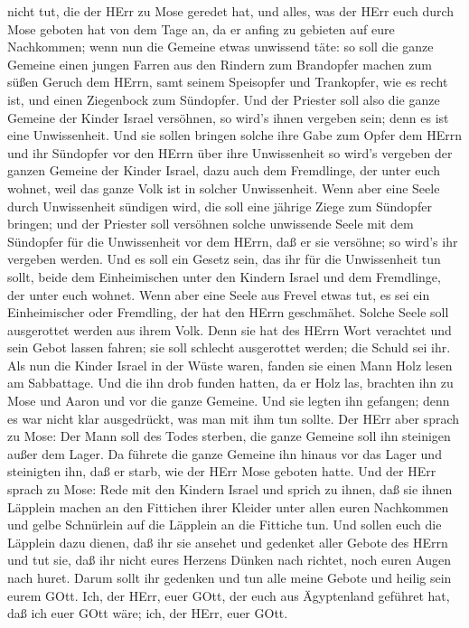nicht tut, die der HErr zu Mose geredet hat,  und alles,
was der HErr euch durch Mose geboten hat von dem Tage an, da er anfing
zu gebieten auf eure Nachkommen;  wenn nun die Gemeine
etwas unwissend täte: so soll die ganze Gemeine einen jungen Farren aus
den Rindern zum Brandopfer machen zum süßen Geruch dem HErrn, samt
seinem Speisopfer und Trankopfer, wie es recht ist, und einen Ziegenbock
zum Sündopfer.  Und der Priester soll also die ganze
Gemeine der Kinder Israel versöhnen, so wird's ihnen vergeben sein; denn
es ist eine Unwissenheit. Und sie sollen bringen solche ihre Gabe zum
Opfer dem HErrn und ihr Sündopfer vor den HErrn über ihre Unwissenheit
 so wird's vergeben der ganzen Gemeine der Kinder Israel,
dazu auch dem Fremdlinge, der unter euch wohnet, weil das ganze Volk ist
in solcher Unwissenheit.  Wenn aber eine Seele durch
Unwissenheit sündigen wird, die soll eine jährige Ziege zum Sündopfer
bringen;  und der Priester soll versöhnen solche unwissende
Seele mit dem Sündopfer für die Unwissenheit vor dem HErrn, daß er sie
versöhne; so wird's ihr vergeben werden.  Und es soll ein
Gesetz sein, das ihr für die Unwissenheit tun sollt, beide dem
Einheimischen unter den Kindern Israel und dem Fremdlinge, der unter
euch wohnet.  Wenn aber eine Seele aus Frevel etwas tut, es
sei ein Einheimischer oder Fremdling, der hat den HErrn geschmähet.
Solche Seele soll ausgerottet werden aus ihrem Volk.  Denn
sie hat des HErrn Wort verachtet und sein Gebot lassen fahren; sie soll
schlecht ausgerottet werden; die Schuld sei ihr.  Als nun
die Kinder Israel in der Wüste waren, fanden sie einen Mann Holz lesen
am Sabbattage.  Und die ihn drob funden hatten, da er Holz
las, brachten ihn zu Mose und Aaron und vor die ganze Gemeine.
 Und sie legten ihn gefangen; denn es war nicht klar
ausgedrückt, was man mit ihm tun sollte.  Der HErr aber
sprach zu Mose: Der Mann soll des Todes sterben, die ganze Gemeine soll
ihn steinigen außer dem Lager.  Da führete die ganze
Gemeine ihn hinaus vor das Lager und steinigten ihn, daß er starb, wie
der HErr Mose geboten hatte.  Und der HErr sprach zu Mose:
 Rede mit den Kindern Israel und sprich zu ihnen, daß sie
ihnen Läpplein machen an den Fittichen ihrer Kleider unter allen euren
Nachkommen und gelbe Schnürlein auf die Läpplein an die Fittiche tun.
 Und sollen euch die Läpplein dazu dienen, daß ihr sie
ansehet und gedenket aller Gebote des HErrn und tut sie, daß ihr nicht
eures Herzens Dünken nach richtet, noch euren Augen nach huret.
 Darum sollt ihr gedenken und tun alle meine Gebote und
heilig sein eurem GOtt.  Ich, der HErr, euer GOtt, der euch
aus Ägyptenland geführet hat, daß ich euer GOtt wäre; ich, der HErr,
euer GOtt.

